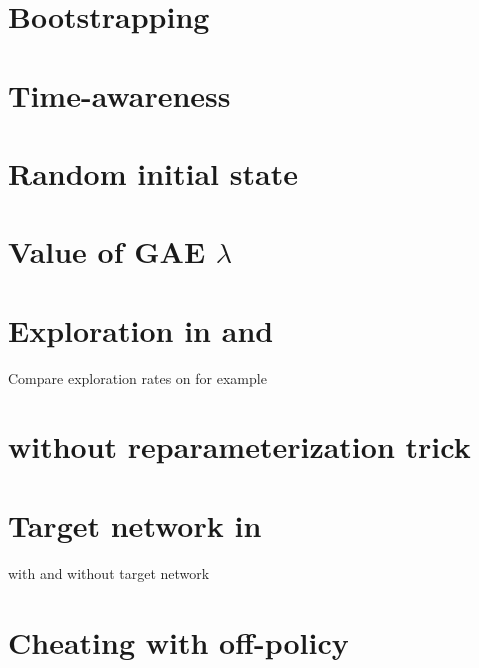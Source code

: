 \section{Bootstrapping}

\section{Time-awareness}

\section{Random initial state}

\section{Value of GAE $\lambda$}

\section{Exploration in \tdt and \sac}

Compare exploration rates on  for example

\section{\sac without reparameterization trick}

\section{Target network in \dqn}

\dqn with and without target network

\section{Cheating with off-policy \ppo}
